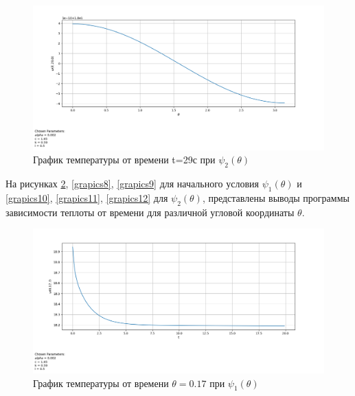 {{\begin{figure}[H]
    \centering                             
	\includegraphics[width=\textwidth,height=\textheight,keepaspectratio]{pos/var_2_t_29.png}                 
	\caption{ График температуры от времени t=29с при $\psi_2(\theta)$}
	\label{grapics6}                           
\end{figure}              

На рисунках \ref{grapics7}, \ref{grapics8}, \ref{grapics9} для начального условия $\psi_1(\theta)$ и \ref{grapics10}, \ref{grapics11}, \ref{grapics12} для $\psi_2(\theta)$, представлены выводы программы зависимости теплоты от времени для различной угловой координаты $\theta$.  

\begin{figure}[H]
    \centering                             
	\includegraphics[width=\textwidth,height=\textheight,keepaspectratio]{kir/var_1_z_0t17.png}                 
	\centering\caption{ График температуры от времени $\theta=0.17$ при $\psi_1(\theta)$}
	\label{grapics7}                           
\end{figure}               

}}
